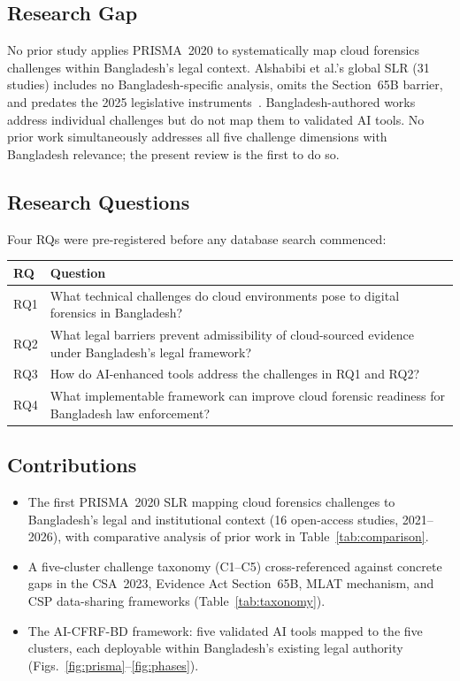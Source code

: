 \documentclass[sigconf,nonacm]{acmart}
\begin{document}
\subsection{Research Gap}

No prior study applies PRISMA~2020 to systematically map cloud forensics
challenges within Bangladesh's legal context. Alshabibi et al.'s global
SLR (31 studies) includes no Bangladesh-specific analysis, omits the
Section~65B barrier, and predates the 2025 legislative
instruments~\cite{alshabibi2024}. Bangladesh-authored
works~\cite{ali2023,akter2023,sharmin2025} address individual challenges
but do not map them to validated AI tools. No prior work simultaneously
addresses all five challenge dimensions with Bangladesh relevance; the
present review is the first to do so.

\subsection{Research Questions}

Four RQs were pre-registered before any database search commenced:

\smallskip
\noindent
\begin{tabular}{@{}lp{6cm}@{}}
\toprule
\textbf{RQ} & \textbf{Question} \\
\midrule
RQ1 & What technical challenges do cloud environments pose to digital
      forensics in Bangladesh? \\
RQ2 & What legal barriers prevent admissibility of cloud-sourced evidence
      under Bangladesh's legal framework? \\
RQ3 & How do AI-enhanced tools address the challenges in RQ1 and RQ2? \\
RQ4 & What implementable framework can improve cloud forensic readiness
      for Bangladesh law enforcement? \\
\bottomrule
\end{tabular}

\subsection{Contributions}
\begin{itemize}
\item The first PRISMA~2020 SLR mapping cloud forensics challenges to
  Bangladesh's legal and institutional context (16 open-access studies,
  2021--2026), with comparative analysis of prior work in Table~\ref{tab:comparison}.

\item A five-cluster challenge taxonomy (C1--C5) cross-referenced against
  concrete gaps in the CSA~2023, Evidence Act Section~65B, MLAT
  mechanism, and CSP data-sharing frameworks (Table~\ref{tab:taxonomy}).

\item The AI-CFRF-BD framework: five validated AI tools mapped to the
  five clusters, each deployable within Bangladesh's existing legal
  authority (Figs.~\ref{fig:prisma}--\ref{fig:phases}).
\end{itemize}
\end{document}
